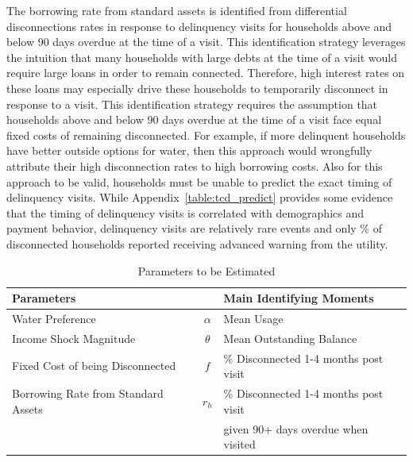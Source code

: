 \documentclass[12pt]{article}
\begin{document}
The borrowing rate from standard assets is identified from differential disconnections rates in response to delinquency visits for households above and below 90 days overdue at the time of a visit.  This identification strategy leverages the intuition that many households with large debts at the time of a visit would require large loans in order to remain connected.  Therefore, high interest rates on these loans may especially drive these households to temporarily disconnect in response to a visit.  This identification strategy requires the assumption that households above and below 90 days overdue at the time of a visit face equal fixed costs of remaining disconnected.  For example, if more delinquent households have better outside options for water, then this approach would wrongfully attribute their high disconnection rates to high borrowing costs.  Also for this approach to be valid, households must be unable to predict the exact timing of delinquency visits.  While Appendix~\ref{table:tcd_predict} provides some evidence that the timing of delinquency visits is correlated with demographics and payment behavior, delinquency visits are relatively rare events and only \unskip\% of disconnected households reported receiving advanced warning from the utility.

\begin{table}[H]
\centering
\caption{Parameters to be Estimated}\label{table:estimparam}
\vspace{-2mm}
\begin{tabular}{l*{1}{cl}}
\toprule
Parameters  &   & Main Identifying Moments  \\
\midrule
Water Preference  & $\alpha$ & Mean Usage \\[.1em]
Income Shock Magnitude & $\theta$ & Mean Outstanding Balance  \\[.1em]
Fixed Cost of being Disconnected  & $f$ &  \% Disconnected 1-4 months post visit \\[.1em]
Borrowing Rate from Standard Assets & $r_h$ & \% Disconnected 1-4 months post visit \\
 & & given 90+ days overdue when visited \\
\bottomrule
\end{tabular}
\end{table}
\end{document}
